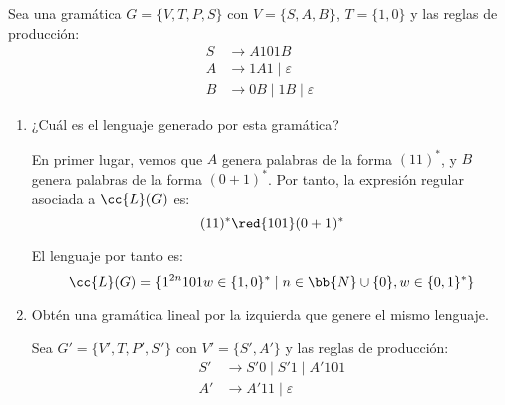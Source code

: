 \documentclass[12pt]{article}
\begin{document}
\begin{ejercicio}
    Sea una gramática $G=\{V,T,P,S\}$ con $V=\{S,A,B\}$, $T=\{1,0\}$ y las reglas de producción:
    \begin{align*}
        S & \rightarrow A101B \\
        A & \rightarrow 1A1\mid \varepsilon \\
        B & \rightarrow 0B \mid 1B\mid \varepsilon
    \end{align*}
    \begin{enumerate}
        \item ¿Cuál es el lenguaje generado por esta gramática?
        
        En primer lugar, vemos que $A$ genera palabras de la forma $(11)^*$, y $B$ genera palabras de la forma $(0+1)^*$. Por tanto, la expresión regular asociada a $\cc{L}(G)$ es:
        \begin{equation*}
            (11)^*\red{101}(0+1)^*
        \end{equation*}

        El lenguaje por tanto es:
        \begin{equation*}
            \cc{L}(G) = \{1^{2n}101w\in \{1,0\}^*\mid n\in \bb{N}\cup \{0\}, w\in\{0,1\}^*\}
        \end{equation*}

        \item Obtén una gramática lineal por la izquierda que genere el mismo lenguaje.
        
        Sea $G'= \{V',T,P',S'\}$ con $V'=\{S',A'\}$ y las reglas de producción:
        \begin{align*}
            S' & \rightarrow S'0 \mid S'1 \mid A'101 \\
            A' & \rightarrow A'11 \mid \varepsilon
        \end{align*}
    \end{enumerate}
\end{ejercicio}
\end{document}
